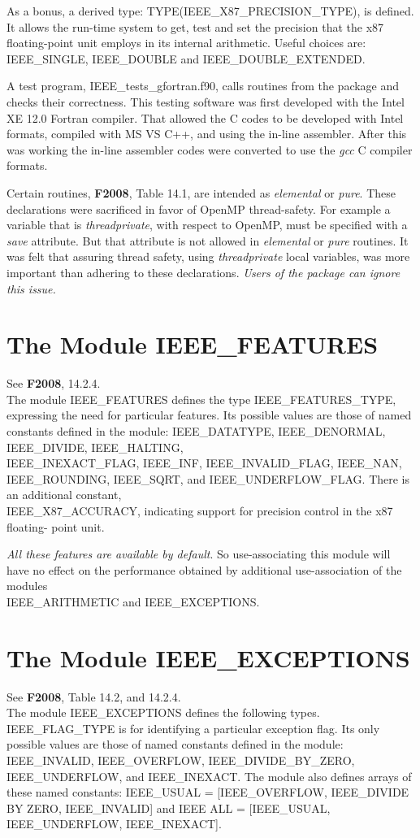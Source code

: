 \documentclass[12pt]{article}
\begin{document}
As a bonus, a derived type: TYPE(IEEE\_X87\_PRECISION\_TYPE), is defined. 
 It allows the run-time system to get, test and set the
precision that the x87 floating-point unit employs in its internal arithmetic.  Useful choices
are:  IEEE\_SINGLE, IEEE\_DOUBLE and IEEE\_DOUBLE\_EXTENDED.

A test program, IEEE\_tests\_gfortran.f90,  calls routines from the package
and checks their correctness.  This testing software was first developed with the Intel XE 12.0 Fortran compiler.  That
allowed the C codes to be developed with Intel formats, compiled with MS VS C++, and using the in-line assembler.  After this was working the in-line assembler codes were converted to use the {\it gcc} C compiler formats.  

Certain routines, {\bf F2008}, Table 14.1, are intended as {\it elemental} or {\it pure}.  These declarations
were sacrificed in favor of OpenMP thread-safety.  For example a variable that is {\it threadprivate}, 
with respect to OpenMP, must be specified with
a {\it save} attribute.  But that attribute is not allowed in  {\it elemental} or {\it pure} routines.
It was felt that assuring thread safety, using {\it threadprivate} local variables,
 was more important than adhering to these declarations.
{\it Users of the package can ignore this issue.}

\section{The Module IEEE\_FEATURES}
See {\bf F2008}, 14.2.4. \\
The module IEEE\_FEATURES defines the type IEEE\_FEATURES\_TYPE,  expressing the need for
 particular features. Its  possible values are those of named constants defined in the module:
IEEE\_DATATYPE, IEEE\_DENORMAL, IEEE\_DIVIDE, IEEE\_HALTING,\\ IEEE\_INEXACT\_FLAG, IEEE\_INF,
IEEE\_INVALID\_FLAG, IEEE\_NAN, IEEE\_ROUNDING, IEEE\_SQRT, and IEEE\_UNDERFLOW\_FLAG.
There is an additional constant,\\  IEEE\_X87\_ACCURACY, indicating support
for precision control in the x87 floating- point unit.

{\it  All these features are available by default}.
So use-associating this module will have no effect  on the performance  obtained by additional
use-association  of the modules\\ IEEE\_ARITHMETIC and IEEE\_EXCEPTIONS. 


\section{The Module IEEE\_EXCEPTIONS}
See {\bf F2008}, Table 14.2, and 14.2.4. \\ 
The module IEEE\_EXCEPTIONS defines the following types.
IEEE\_FLAG\_TYPE is for identifying a particular exception flag.
Its only possible values are those of
named constants defined in the module: IEEE\_INVALID, IEEE\_OVERFLOW, IEEE\_DIVIDE\_BY\_ZERO,
IEEE\_UNDERFLOW, and IEEE\_INEXACT.  The module also defines arrays of these named constants: 
IEEE\_USUAL = [IEEE\_OVERFLOW, IEEE\_DIVIDE BY ZERO, IEEE\_INVALID] and IEEE ALL = 
[IEEE\_USUAL, IEEE\_UNDERFLOW, IEEE\_INEXACT].
\end{document}
